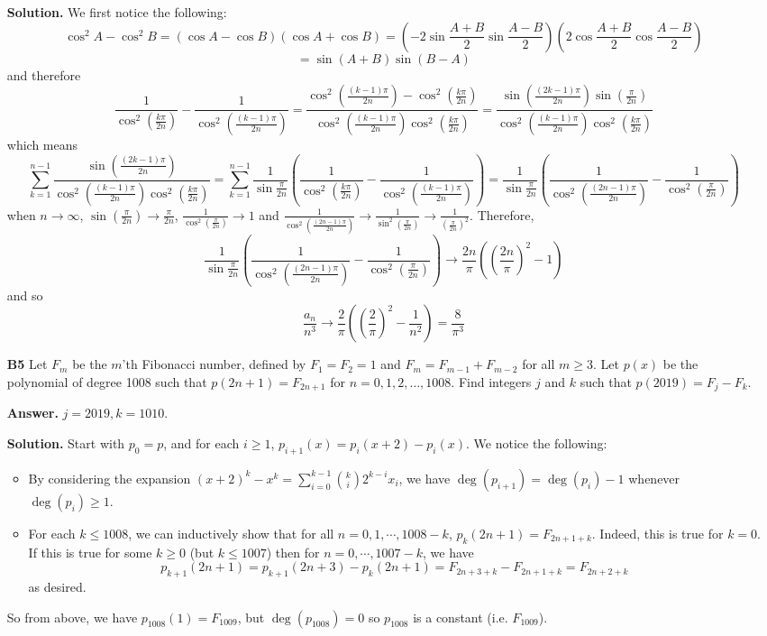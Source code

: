 \documentclass[11pt,a4paper]{article}
\newcommand{\<}{\langle}
\renewcommand{\>}{\rangle}
\begin{document}
\begin{enumerate}
	\textbf{Solution.} We first notice the following: 
	\[
	\cos^2 A - \cos^2B = (\cos A-\cos B)(\cos A+\cos B)=(-2\sin\frac{A+B}{2}\sin\frac{A-B}{2})(2\cos\frac{A+B}{2}\cos\frac{A-B}{2})
	\]
	\[
	=\sin(A+B)\sin(B-A)
	\]
	and therefore 
	\[
	\frac{1}{\cos^2(\frac{k\pi}{2n})}-\frac{1}{\cos^2(\frac{(k-1)\pi}{2n})}
	=\frac{\cos^2(\frac{(k-1)\pi}{2n})-\cos^2(\frac{k\pi}{2n})}{\cos^2(\frac{(k-1)\pi}{2n})\cos^2(\frac{k\pi}{2n})}
	=\frac{\sin(\frac{(2k-1)\pi}{2n})\sin(\frac{\pi}{2n})}{\cos^2(\frac{(k-1)\pi}{2n})\cos^2(\frac{k\pi}{2n})}
	\]
	which means 
	\[
	\sum_{k=1}^{n-1}\frac{\sin(\frac{(2k-1)\pi}{2n})}{\cos^2(\frac{(k-1)\pi}{2n})\cos^2(\frac{k\pi}{2n})}
	=\sum_{k=1}^{n-1}\frac{1}{\sin\frac{\pi}{2n}}(\frac{1}{\cos^2(\frac{k\pi}{2n})}-\frac{1}{\cos^2(\frac{(k-1)\pi}{2n})})
	=\frac{1}{\sin\frac{\pi}{2n}}(\frac{1}{\cos^2(\frac{(2n-1)\pi}{2n})} - \frac{1}{\cos^2(\frac{\pi}{2n})})
	\]
	when $n\to\infty$, $\sin(\frac{\pi}{2n})\to \frac{\pi}{2n}$, $\frac{1}{\cos^2(\frac{\pi}{2n})}\to 1$ and $\frac{1}{\cos^2(\frac{(2n-1)\pi}{2n})}\to \frac{1}{\sin^2(\frac{\pi}{2n})}\to\frac{1}{(\frac{\pi}{2n})^2}$. Therefore, 
	\[
	\frac{1}{\sin\frac{\pi}{2n}}(\frac{1}{\cos^2(\frac{(2n-1)\pi}{2n})} - \frac{1}{\cos^2(\frac{\pi}{2n})})
	\to \frac{2n}{\pi}((\frac{2n}{\pi})^2-1)
	\]
	and so 
	\[
	\frac{a_n}{n^3}\to \frac{2}{\pi}((\frac{2}{\pi})^2-\frac{1}{n^2})=\frac{8}{\pi^3}
	\]
	
	\item [\textbf{B5}] Let $F_m$ be the $m$'th Fibonacci number, defined by $F_1=F_2=1$ and $F_m = F_{m-1}+F_{m-2}$ for all $m \geq 3$. Let $p(x)$ be the polynomial of degree 1008 such that $p(2n+1)=F_{2n+1}$ for $n=0,1,2,\ldots,1008$. Find integers $j$ and $k$ such that $p(2019) = F_j - F_k$.
	
	\textbf{Answer.} $j=2019, k=1010$. 
	
	\textbf{Solution.}
	Start with $p_0=p$, and for each $i\ge 1$, $p_{i+1}(x)=p_{i}(x+2)-p_{i}(x)$. 
	We notice the following: 
	\begin{itemize}
		\item By considering the expansion $(x+2)^k-x^k = \sum_{i=0}^{k-1} \binom{k}{i}2^{k-i}x_i$, we have $\deg(p_{i+1})=\deg(p_i)-1$ whenever $\deg(p_i)\ge 1$. 
		
		\item For each $k\le 1008$, we can inductively show that for all $n=0, 1, \cdots, 1008-k$, 
		$p_k(2n+1)=F_{2n+1+k}$. 
		Indeed, this is true for $k=0$. 
		If this is true for some $k\ge 0$ (but $k\le 1007$) 
		then for $n=0, \cdots, 1007-k$, we have 
		\[
		p_{k+1}(2n+1)=p_{k+1}(2n+3)-p_{k}(2n+1)
		=F_{2n+3+k}-F_{2n+1+k}
		=F_{2n+2+k}
		\]
		as desired. 
	\end{itemize}
    So from above, we have $p_{1008}(1)=F_{1009}$, but $\deg(p_{1008})=0$ so $p_{1008}$ is a constant (i.e. $F_{1009}$). 
    

\end{enumerate}
\end{document}
